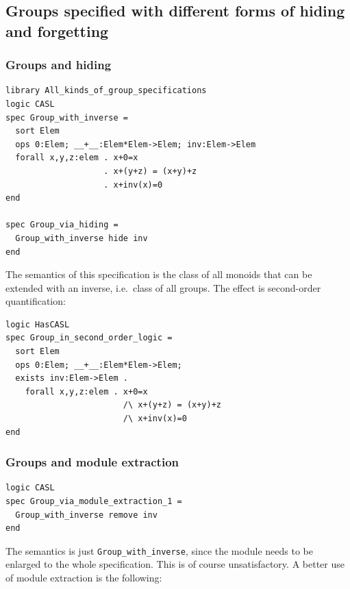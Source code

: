 \documentclass[10pt,fleqn,final]{scrreprt}
\newcommand*{\syntax}[1]{\texttt{#1}}
\newcommand{\ssclause}[1]{\subsection{#1}}
\newcommand{\sssclause}[1]{\subsubsection{#1}}
\begin{document}
\ssclause{Groups specified with different forms of hiding and forgetting}

\sssclause{Groups and hiding}
\begin{lstlisting}[basicstyle=\ttfamily,language=dolText,morekeywords={props,ObjectProperty,Class,DisjointUnionOf,SubClassOf,Characteristics,Transitive,Asymmetric,SubPropertyOf,DisjointClasses,EquivalentTo,inverse,only,forall,iff,if,or,exists,sort,ops,spec},escapechar=@,mathescape]
library All_kinds_of_group_specifications
logic CASL
spec Group_with_inverse =
  sort Elem
  ops 0:Elem; __+__:Elem*Elem->Elem; inv:Elem->Elem
  forall x,y,z:elem . x+0=x
                    . x+(y+z) = (x+y)+z
                    . x+inv(x)=0
end

spec Group_via_hiding =
  Group_with_inverse hide inv
end
\end{lstlisting}

The semantics of this specification is the class of all monoids that
can be extended with an inverse, i.e.\ class of all groups. The effect
is second-order quantification:

\begin{lstlisting}[basicstyle=\ttfamily,language=dolText,morekeywords={props,ObjectProperty,Class,DisjointUnionOf,SubClassOf,Characteristics,Transitive,Asymmetric,SubPropertyOf,DisjointClasses,EquivalentTo,inverse,only,forall,iff,if,or,exists,sort,ops,spec},escapechar=@,mathescape]
logic HasCASL
spec Group_in_second_order_logic =
  sort Elem
  ops 0:Elem; __+__:Elem*Elem->Elem; 
  exists inv:Elem->Elem .
    forall x,y,z:elem . x+0=x
                        /\ x+(y+z) = (x+y)+z
                        /\ x+inv(x)=0
end
\end{lstlisting}

\sssclause{Groups and module extraction}

\begin{lstlisting}[basicstyle=\ttfamily,language=dolText,morekeywords={props,ObjectProperty,Class,DisjointUnionOf,SubClassOf,Characteristics,Transitive,Asymmetric,SubPropertyOf,DisjointClasses,EquivalentTo,inverse,only,forall,iff,if,or,exists,sort,ops,spec,forget},escapechar=@,mathescape]
logic CASL
spec Group_via_module_extraction_1 =
  Group_with_inverse remove inv
end
\end{lstlisting}
The semantics is just \syntax{Group\_with\_inverse},
since the module needs to be enlarged to the whole specification.
This is of course unsatisfactory. A better use of module extraction
is the following:
\end{document}
